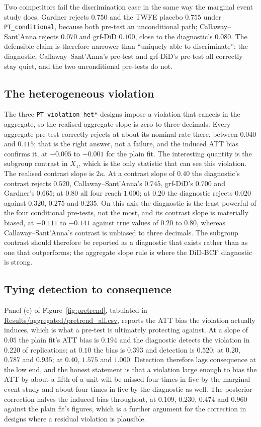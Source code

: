 \documentclass[11pt]{article}
\begin{document}
Two competitors fail the discrimination case in the same way the marginal
event study does. Gardner rejects $0.750$ and the TWFE placebo $0.755$ under
\texttt{PT\_conditional}, because both pre-test an unconditional path;
Callaway--Sant'Anna rejects $0.070$ and grf-DiD $0.100$, close to the
diagnostic's $0.080$. The defensible claim is therefore narrower than
``uniquely able to discriminate'': the diagnostic, Callaway--Sant'Anna's
pre-test and grf-DiD's pre-test all correctly stay quiet, and the two
unconditional pre-tests do not.

\subsection{The heterogeneous violation}

The three \texttt{PT\_violation\_het*} designs impose a violation that cancels
in the aggregate, so the realised aggregate slope is zero to three decimals.
Every aggregate pre-test correctly rejects at about its nominal rate there,
between $0.040$ and $0.115$; that is the right answer, not a failure, and the
induced ATT bias confirms it, at $-0.005$ to $-0.001$ for the plain fit. The
interesting quantity is the subgroup contrast in $X_1$, which is the only
statistic that can see this violation. The realised contrast slope is $2\kappa$. At a contrast slope of $0.40$ the
diagnostic's contrast rejects $0.520$, Callaway--Sant'Anna's $0.745$,
grf-DiD's $0.700$ and Gardner's $0.665$; at $0.80$ all four reach $1.000$; at
$0.20$ the diagnostic rejects $0.020$ against $0.320$, $0.275$ and $0.235$. On this
axis the diagnostic is the least powerful of the four conditional pre-tests,
not the most, and its contrast slope is materially biased, at $-0.111$ to
$-0.141$ against true values of $0.20$ to $0.80$, whereas
Callaway--Sant'Anna's contrast is unbiased to three decimals. The subgroup
contrast should therefore be reported as a diagnostic that exists rather than
as one that outperforms; the aggregate slope rule is where the DiD-BCF
diagnostic is strong.

\subsection{Tying detection to consequence}

Panel (c) of Figure~\ref{fig:pretrend}, tabulated in
\url{Results/aggregated/pretrend_all.csv}, reports the ATT bias the violation
actually induces, which is what a pre-test is ultimately protecting against.
At a slope of $0.05$ the plain fit's ATT bias is $0.194$ and the diagnostic
detects the violation in $0.220$ of replications; at $0.10$ the bias is
$0.393$ and detection is $0.520$; at $0.20$, $0.787$ and $0.935$; at $0.40$,
$1.575$ and $1.000$. Detection therefore lags consequence at the low end, and
the honest statement is that a violation large enough to bias the ATT by about
a fifth of a unit will be missed four times in five by the marginal event
study and about four times in five by the diagnostic as well. The posterior
correction halves the induced bias throughout, at $0.109$, $0.230$, $0.474$
and $0.960$ against the plain fit's figures, which is a further argument for
the correction in designs where a residual violation is plausible.
\end{document}

